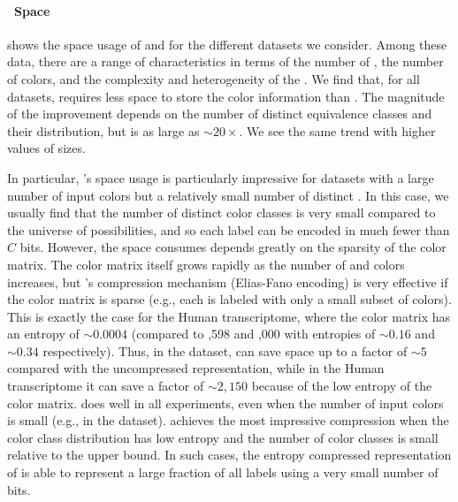 \paragraph*{~Space} shows the space usage of \rainbowfish and \vari
for the different datasets we consider. Among these data, there are a range of
characteristics in terms of the number of \kmers, the number of colors, and the
complexity and heterogeneity of the \dbg. We find that, for all datasets,
\rainbowfish requires less space to store the color information than \vari.  The
magnitude of the improvement depends on the number of distinct equivalence
classes and their distribution, but is as large as $\sim 20\times$.  We see the
same trend with higher values of \kmer sizes.


In particular, \rainbowfish's space usage is particularly impressive for datasets
with a large number of input colors but a relatively small number of distinct
\kmers. In this case, we usually find that the number of distinct color classes
is very small compared to the universe of possibilities, and so each label can
be encoded in much fewer than $C$ bits. However, the space \vari consumes
depends greatly on the sparsity of the color matrix. The color matrix itself
grows rapidly as the number of \kmers and colors increases, but \vari's
compression mechanism (Elias-Fano encoding) is very effective if the color
matrix is sparse (e.g., each \kmer is labeled with only a small subset of
colors). This is exactly the case for the Human transcriptome, where the color
matrix has an entropy of $\sim 0.0004$ (compared to ,598 and ,000 with entropies of $\sim 0.16$ and $\sim 0.34$ respectively). Thus, in the
\ecoli dataset, \vari can save space up to a factor of $\sim 5$ compared with
the uncompressed representation, while in the Human transcriptome it can save a
factor of $\sim 2,150$ because of the low entropy of the color matrix. \rainbowfish
does well in all experiments, even when the number of input colors is small
(e.g., in the \plant dataset). \rainbowfish achieves the most impressive compression
when the color class distribution has low entropy and the number of color classes
is small relative to the upper bound.
In such cases, the entropy compressed representation of \rainbowfish is able to
represent a large fraction of all labels using a very small number of bits.


